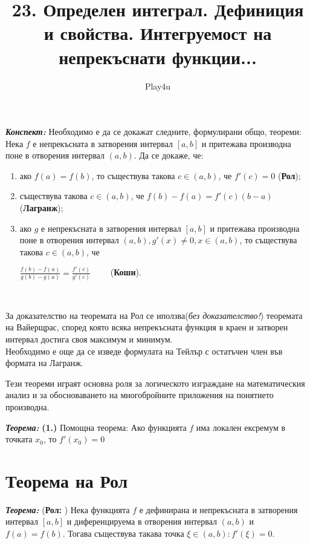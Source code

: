 \documentclass[11pt]{article} %
\title{23. Определен интеграл. Дефиниция и свойства. Интегруемост на непрекъснати функции...}
\author{Play4u}
\newcommand{\italicBold}[1]{\textbf{\emph{#1}}}
\newcommand{\theorem}{\italicBold{Теорема: }}
\newcommand{\enumlet}{\renewcommand{\theenumi}{\alph{enumi}}}
\begin{document}
\maketitle

\italicBold{Конспект: } Необходимо е да се докажат следните, формулирани общо, теореми: Нека $f$ е непрекъсната в затворения интервал $[a,b]$ и притежава производна поне в отворения интервал $(a,b)$. Да се докаже, че:

\enumlet
\begin{enumerate}
	\item ако $f(a)=f(b)$, то съществува такова $c \in (a,b)$, че $f'(c)=0$ (\textbf{Рол});\\
	\item съществува такова $c \in (a,b)$, че $f(b)-f(a)=f'(c)(b-a)$ (\textbf{Лагранж});\\
	\item ако $g$ е непрекъсната в затворения интервал $[a,b]$ и притежава производна поне в отворения интервал $(a,b), g'(x) \neq 0, x \in (a,b)$, то съществува такова $c \in (a,b)$, че \\
		\centerline{$\frac{f(b)-f(a)}{g(b)-g(a)}=\frac{f'(c)}{g'(c)} \qquad$ (\textbf{Коши}).}\\
\end{enumerate}
За доказателство на теоремата на Рол се иползва(\textit{без доказателство!}) теоремата на Вайерщрас, според която всяка непрекъсната функция в краен и затворен интервал достига своя максимум и минимум.\\
Необходимо е още да се изведе формулата на Тейлър с остатъчен член във формата на Лагранж.\\\par

Тези теореми играят основна роля за логическото изграждане на математическия анализ и за обосноваването на многобройните приложения на понятието производна.

\theorem \textbf{(1.)} Помощна теорема: Ако функцията $f$ има локален ексремум в точката $x_{0}$, то $f'(x_{0}) = 0$

\section{Теорема на Рол}
\theorem (\textbf{Рол: }) Нека функцията $f$ е дефинирана и непрекъсната в затворения интервал $[a,b]$ и диференцируема в отворения интервал $(a,b)$ и $f(a) = f(b)$. Тогава съществува такава точка $\xi \in (a,b): f'(\xi) = 0$.
\end{document}
